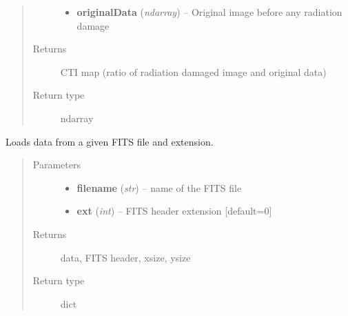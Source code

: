 \documentclass[a4paper,12pt,english]{sphinxmanual}
\begin{document}
\begin{fulllineitems}
\begin{fulllineitems}
\begin{quote}
\begin{description}
\begin{itemize}
\item {} 
\textbf{originalData} (\emph{ndarray}) -- Original image before any radiation damage

\end{itemize}

\item[{Returns}] \leavevmode
CTI map (ratio of radiation damaged image and original data)

\item[{Return type}] \leavevmode
ndarray

\end{description}\end{quote}

\end{fulllineitems}


\begin{fulllineitems}
\label{postproc:postproc.postprocessing.PostProcessing.loadFITS}
Loads data from a given FITS file and extension.
\begin{quote}\begin{description}
\item[{Parameters}] \leavevmode\begin{itemize}
\item {} 
\textbf{filename} (\emph{str}) -- name of the FITS file

\item {} 
\textbf{ext} (\emph{int}) -- FITS header extension {[}default=0{]}

\end{itemize}

\item[{Returns}] \leavevmode
data, FITS header, xsize, ysize

\item[{Return type}] \leavevmode
dict

\end{description}\end{quote}

\end{fulllineitems}



\end{fulllineitems}
\end{document}
